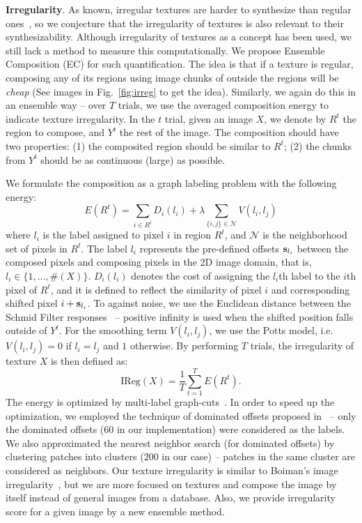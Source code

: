 \documentclass[10pt,twocolumn,letterpaper]{article}
\begin{document}
\textbf{Irregularity}.  As known, irregular textures are harder to
synthesize than regular ones~\cite{Liu:2004:NTA}, so we conjecture
that the irregularity of textures is also relevant to their
synthesizability. Although irregularity of textures as a concept has
been used, we still lack a method to measure this
computationally. We propose Ensemble Composition (EC) for such
quantification. The idea is that if a texture is regular, composing
any of its regions using image chunks of outside the regions will be
\emph{cheap} (See images in Fig.~\ref{fig:irreg} to get the
idea). Similarly, we again do this in an ensemble way -- over $T$
trials, we use the averaged composition energy to indicate texture
irregularity. In the $t$ trial, given an image $X$, we denote by $R^t$
the region to compose, and $Y^t$ the rest of the image. The
composition should have two properties: (1) the composited region
should be similar to $R^t$; (2) the chunks from $Y^t$ should be as
continuous (large) as possible.

We formulate the composition
as a graph labeling problem with the following energy: 
\begin{equation}
  \label{eq:regu:energy}
  E(R^t) = \sum_{i\in R^t}D_i(l_i) + \lambda \sum_{\{i,j\} \in \mathcal{N}}V(l_i, l_j)
\end{equation}
where $l_i$ is the label assigned to pixel $i$ in region $R^t$, and
$\mathcal{N}$ is the neighborhood set of pixels in $R^t$. The label
$l_i$ represents the pre-defined offsets $\bold{s}_{l_i}$ between the
composed pixels and composing pixels in the 2D image domain, that is,
$l_i \in \{1, ..., \#(X)\}$.  $D_i(l_i)$ denotes the cost of assigning
the $l_i$th label to the $i$th pixel of $R^t$, and it is defined to
reflect the similarity of pixel $i$ and corresponding shifted pixel
$i+\bold{s}_{l_i}$. To against noise, we use the Euclidean distance
between the Schmid Filter responses~\cite{Schmid01} -- positive infinity is used when the shifted position falls outside of
$Y^t$. For the smoothing term $V(l_i, l_j)$, we use the
Potts model, i.e. $V(l_i,l_j) = 0$ if $l_i = l_j$ and $1$
otherwise. By performing $T$ trials, the irregularity of texture $X$ is
then defined as:
\begin{equation}
  \label{eq:regularity}
  \text{IReg}(X) = \frac{1}{T} \sum_{t=1}^{T}E(R^t). 
\end{equation}
The energy is optimized by multi-label graph-cuts~\cite{graphcut}.  In
order to speed up the optimization, we employed the technique of
dominated offsets proposed in~\cite{He:completion:eccv12} -- only the
dominated offsets ($60$ in our implementation) were considered as the
labels. We also approximated the nearest neighbor search (for
dominated offsets) by clustering patches into clusters ($200$ in our
case) -- patches in the same cluster are considered as neighbors. Our
texture irregularity is similar to Boiman's image
irregularity~\cite{Boiman:07}, but we are more focused on textures and
compose the image by itself instead of general images from a
database. Also, we provide irregularity score for a given image by a
new ensemble method.
\end{document}
